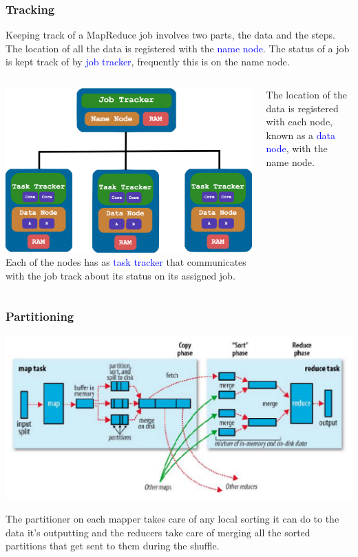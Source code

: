 \documentclass{beamer}
\begin{document}
\begin{frame}
  \frametitle{Tracking}
  Keeping track of a MapReduce job involves two parts, the data and the steps. The location of all the data is registered with the \textcolor{blue}{name node}. The status of a job is kept track of by \textcolor{blue}{job tracker}, frequently this is on the name node.
  \vspace{2mm}

  \begin{columns}
      \includegraphics[width=\textwidth]{../images/tracking.png}
      Each of the nodes has as \textcolor{blue}{task tracker} that communicates with the job track about its status on its assigned job. \vspace{2mm}

      The location of the data is registered with each node, known as a \textcolor{blue}{data node}, with the name node.
  \end{columns}
\end{frame}

\begin{frame}
  \frametitle{Partitioning}
  \begin{center}
    \includegraphics[width=\textwidth]{../images/partitioning.png}
  \end{center}

    \parbox{\linewidth}{\small The partitioner on each mapper takes care of any local sorting it can do to the data it's outputting and the reducers take care of merging all the sorted partitions that get sent to them during the shuffle.}
\end{frame}
\end{document}
